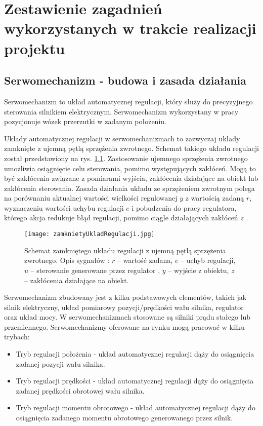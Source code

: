 \chapter{Zestawienie zagadnień wykorzystanych w trakcie realizacji projektu}
\label{cha:Zestawienie zagadnien wykorzystanych w pracy}

\section{Serwomechanizm - budowa i zasada działania}
Serwomechanizm to układ automatycznej regulacji, który służy do precyzyjnego sterowania silnikiem elektrycznym. Serwomechanizm wykorzystany w pracy pozycjonuje wózek przerzutki w zadanym położeniu.

Układy automatycznej regulacji w serwomechanizmach to zazwyczaj układy zamknięte z ujemną pętlą sprzężenia zwrotnego. Schemat takiego układu regulacji został przedstawiony na rys. \ref{fig:zamknietyUklad}. Zastosowanie ujemnego sprzężenia zwrotnego umożliwia osiągnięcie celu sterowania, pomimo występujących zakłóceń. Mogą to być zakłócenia związane z pomiarami wyjścia, zakłócenia działające na obiekt lub zakłócenia sterowania. Zasada działania układu ze sprzężeniem zwrotnym polega na porównaniu aktualnej wartości wielkości regulowanej $y$ z wartością zadaną $r$, wyznaczeniu wartości uchybu regulacji $e$ i pobudzenia do pracy regulatora, którego akcja redukuje błąd regulacji, pomimo ciągle działających zakłóceń $z$ \cite{zamknietyB}.
\begin{figure}[h]
    \centering
    \texttt{[image: zamknietyUkladRegulacji.jpg]}
    \caption{Schemat zamkniętego układu regulacji z ujemną pętlą sprzężenia zwrotnego. Opis sygnałów : $r$ – wartość zadana,  $e$ – uchyb regulacji, $u$ – sterowanie generowane przez regulator , $y$ – wyjście z obiektu, $z$ – zakłócenia działające na obiekt.}
    \label{fig:zamknietyUklad}
\end{figure}

Serwomechanizm zbudowany jest z kilku podstawowych elementów, takich jak silnik elektryczny, układ pomiarowy pozycji/prędkości wału silnika, regulator oraz układ mocy. W serwomechanizmach stosowane są silniki prądu stałego lub przemiennego. Serwomechanizmy oferowane na rynku mogą pracować w kilku trybach:
\begin{itemize}
\item
     Tryb regulacji położenia - układ automatycznej regulacji dąży do osiągnięcia zadanej pozycji wału silnika.
\item
    Tryb regulacji prędkości - układ automatycznej regulacji dąży do osiągnięcia zadanej prędkości obrotowej wału silnika.
\item
    Tryb regulacji momentu obrotowego - układ automatycznej regulacji dąży do osiągnięcia zadanego momentu obrotowego generowanego przez silnik.
\end{itemize}

